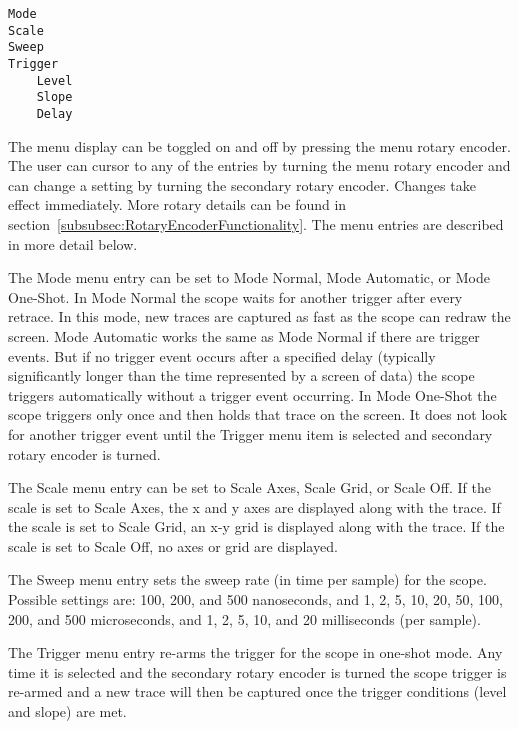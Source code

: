 \documentclass[12pt]{refart} %
\begin{document}
\begin{verbatim}
Mode
Scale
Sweep
Trigger
    Level
    Slope
    Delay
\end{verbatim}

The menu display can be toggled on and off by pressing the menu rotary encoder. The user can cursor to any of the entries by turning the menu rotary encoder and can change a setting by turning the secondary rotary encoder. Changes take effect immediately. More rotary details can be found in section~\ref{subsubsec:RotaryEncoderFunctionality}. The menu entries are described in more detail below.

\begin{description}
	\item[Mode]The Mode menu entry can be set to Mode Normal, Mode Automatic, or Mode One-Shot. In Mode Normal the scope waits for another trigger after every retrace. In this mode, new traces are captured as fast as the scope can redraw the screen. Mode Automatic works the same as Mode Normal if there are trigger events. But if no trigger event occurs after a specified delay (typically significantly longer than the time represented by a screen of data) the scope triggers automatically without a trigger event occurring. In Mode One-Shot the scope triggers only once and then holds that trace on the screen. It does not look for another trigger event until the Trigger menu item is selected and secondary rotary encoder is turned.
	
	\item[Scale] The Scale menu entry can be set to Scale Axes, Scale Grid, or Scale Off. If the scale is set to Scale Axes, the x and y axes are displayed along with the trace. If the scale is set to Scale Grid, an x-y grid is displayed along with the trace. If the scale is set to Scale Off, no axes or grid are displayed.
	
	\item[Sweep] The Sweep menu entry sets the sweep rate (in time per sample) for the scope. Possible settings are: 100, 200, and 500 nanoseconds, and 1, 2, 5, 10, 20, 50, 100, 200, and 500 microseconds, and 1, 2, 5, 10, and 20 milliseconds (per sample).
	
	\item[Trigger] The Trigger menu entry re-arms the trigger for the scope in one-shot mode. Any time it is selected and the secondary rotary encoder is turned the scope trigger is re-armed and a new trace will then be captured once the trigger conditions (level and slope) are met.
	

\end{description}
\end{document}
